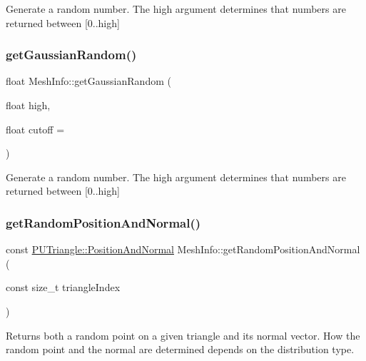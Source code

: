 Generate a random number. The high argument determines that numbers are returned between \mbox{[}0..high\mbox{]} \mbox{\label{classMeshInfo_a1414c8a370c9878dafb0757c99d3b737}} 
\subsubsection{\texorpdfstring{get\+Gaussian\+Random()}{getGaussianRandom()}\hspace{0.1cm}{\footnotesize\ttfamily [2/2]}}
{\footnotesize\ttfamily float Mesh\+Info\+::get\+Gaussian\+Random (\begin{DoxyParamCaption}\item[{float}]{high,  }\item[{float}]{cutoff = {} }\end{DoxyParamCaption})}

Generate a random number. The high argument determines that numbers are returned between \mbox{[}0..high\mbox{]} \mbox{\label{classMeshInfo_aa4e919b45d5c74e273fe94b1ab44f385}} 
\subsubsection{\texorpdfstring{get\+Random\+Position\+And\+Normal()}{getRandomPositionAndNormal()}\hspace{0.1cm}{\footnotesize\ttfamily [1/2]}}
{\footnotesize\ttfamily const \hyperlink{structPUTriangle_1_1PositionAndNormal}{P\+U\+Triangle\+::\+Position\+And\+Normal} Mesh\+Info\+::get\+Random\+Position\+And\+Normal (\begin{DoxyParamCaption}\item[{const size\+\_\+t}]{triangle\+Index }\end{DoxyParamCaption})}

Returns both a random point on a given triangle and its normal vector. How the random point and the normal are determined depends on the distribution type. \mbox{\label{classMeshInfo_aa4e919b45d5c74e273fe94b1ab44f385}} 
